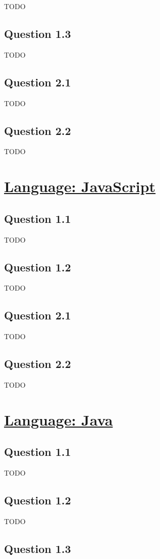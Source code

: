 \documentclass[a4paper,10pt]{article} %
\begin{document}
    TODO
\subsection*{\textbf{Question 1.3}}
    TODO
\subsection*{\textbf{Question 2.1}}
    TODO
\subsection*{\textbf{Question 2.2}}
    TODO


\section*{\underline{Language: JavaScript}}

    \subsection*{\textbf{Question 1.1}}
    TODO
    \subsection*{\textbf{Question 1.2}}
        TODO
    \subsection*{\textbf{Question 2.1}}
        TODO
    \subsection*{\textbf{Question 2.2}}
        TODO

\section*{\underline{Language: Java}}
    \subsection*{\textbf{Question 1.1}}

    TODO

    \subsection*{\textbf{Question 1.2}}

    TODO

    \subsection*{\textbf{Question 1.3}}
\end{document}
